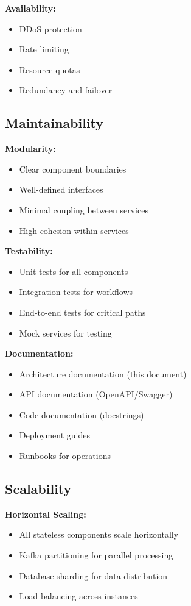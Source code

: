 \documentclass[12pt,a4paper]{article}
\begin{document}
\textbf{Availability:}
\begin{itemize}[leftmargin=1cm,itemsep=0pt]
    \item DDoS protection
    \item Rate limiting
    \item Resource quotas
    \item Redundancy and failover
\end{itemize}

\subsection{Maintainability}

\textbf{Modularity:}
\begin{itemize}[leftmargin=1cm,itemsep=0pt]
    \item Clear component boundaries
    \item Well-defined interfaces
    \item Minimal coupling between services
    \item High cohesion within services
\end{itemize}

\textbf{Testability:}
\begin{itemize}[leftmargin=1cm,itemsep=0pt]
    \item Unit tests for all components
    \item Integration tests for workflows
    \item End-to-end tests for critical paths
    \item Mock services for testing
\end{itemize}

\textbf{Documentation:}
\begin{itemize}[leftmargin=1cm,itemsep=0pt]
    \item Architecture documentation (this document)
    \item API documentation (OpenAPI/Swagger)
    \item Code documentation (docstrings)
    \item Deployment guides
    \item Runbooks for operations
\end{itemize}

\subsection{Scalability}

\textbf{Horizontal Scaling:}
\begin{itemize}[leftmargin=1cm,itemsep=0pt]
    \item All stateless components scale horizontally
    \item Kafka partitioning for parallel processing
    \item Database sharding for data distribution
    \item Load balancing across instances
\end{itemize}
\end{document}
